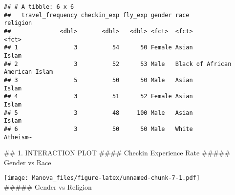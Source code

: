 \documentclass[
]{article}
\newenvironment{Shaded}{\begin{snugshade}}{\end{snugshade}}
\newcommand{\AttributeTok}[1]{\textcolor[rgb]{0.77,0.63,0.00}{#1}}
\newcommand{\DecValTok}[1]{\textcolor[rgb]{0.00,0.00,0.81}{#1}}
\newcommand{\FunctionTok}[1]{\textcolor[rgb]{0.00,0.00,0.00}{#1}}
\newcommand{\NormalTok}[1]{#1}
\newcommand{\SpecialCharTok}[1]{\textcolor[rgb]{0.00,0.00,0.00}{#1}}
\newcommand{\StringTok}[1]{\textcolor[rgb]{0.31,0.60,0.02}{#1}}
\begin{document}
\begin{verbatim}
## # A tibble: 6 x 6
##   travel_frequency checkin_exp fly_exp gender race                      religion
##              <dbl>       <dbl>   <dbl> <fct>  <fct>                     <fct>   
## 1                3          54      50 Female Asian                     Islam   
## 2                3          52      53 Male   Black of African American Islam   
## 3                5          50      50 Male   Asian                     Islam   
## 4                3          51      52 Female Asian                     Islam   
## 5                3          48     100 Male   Asian                     Islam   
## 6                3          50      50 Male   White                     Atheism~
\end{verbatim}

\hfill\break
\#\# 1. INTERACTION PLOT \#\#\#\# Checkin Experience Rate \#\#\#\#\#
Gender vs Race

\begin{Shaded}
\end{Shaded}

\texttt{[image: Manova\_files/figure-latex/unnamed-chunk-7-1.pdf]}\\
\#\#\#\#\# Gender vs Religion
\end{document}
